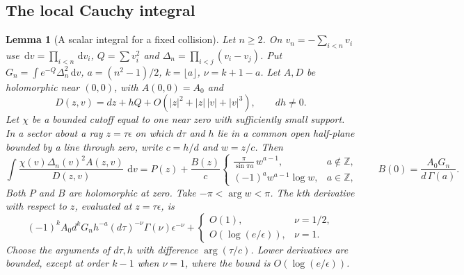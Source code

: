 \documentclass[11pt]{article}
\numberwithin{equation}{section}
\newtheorem{lemma}[theorem]{Lemma}
\theoremstyle{definition}
\newcommand{\dd}{\,\mathrm d}
\begin{document}
\subsection{The local Cauchy integral}

\begin{lemma}[A scalar integral for a fixed collision]\label{lem:local-period}
Let $n\ge2$. On $v_n=-\sum_{i<n}v_i$ use $\dd v=\prod_{i<n}\dd v_i$,
$Q=\sum v_i^2$ and $\Delta_n=\prod_{i<j}(v_i-v_j)$. Put
$G_n=\int e^{-Q}\Delta_n^2\dd v$, $a=(n^2-1)/2$,
$k=\lfloor a\rfloor$, $\nu=k+1-a$. Let $A,D$ be holomorphic near
$(0,0)$, with $A(0,0)=A_0$ and
\[
 D(z,v)=dz+hQ+O(|z|^2+|z|\,|v|+|v|^3),\qquad dh\ne0 .
\]
Let $\chi$ be a bounded cutoff equal to one near zero with sufficiently
small support. In a sector about a ray $z=\tau\epsilon$ on which
$d\tau$ and $h$ lie in a common open half-plane bounded by a line
through zero, write $c=h/d$ and $w=z/c$. Then
\[
 \int\frac{\chi(v)\Delta_n(v)^2 A(z,v)}{D(z,v)}\,\dd v
 =P(z)+\frac{B(z)}{c}
 \begin{cases}
   \displaystyle\frac{\pi}{\sin\pi a}\,w^{a-1},&a\notin\mathbb Z,\\
   (-1)^a w^{a-1}\log w,&a\in\mathbb Z ,
 \end{cases}
 \qquad B(0)=\frac{A_0G_n}{d\,\Gamma(a)} .
\]
Both $P$ and $B$ are holomorphic at zero. Take $-\pi<\arg w<\pi$.
The $k$th derivative with respect to $z$, evaluated at $z=\tau\epsilon$, is
\begin{equation}\label{eq:local-period}
 (-1)^k A_0d^k G_n h^{-a}(d\tau)^{-\nu}\Gamma(\nu)\epsilon^{-\nu}
  +\begin{cases}O(1),&\nu=1/2,\\ O(\log(e/\epsilon)),&\nu=1.\end{cases}
\end{equation}
Choose the arguments of $d\tau,h$ with difference $\arg(\tau/c)$.
Lower derivatives are bounded, except at order $k-1$ when $\nu=1$,
where the bound is $O(\log(e/\epsilon))$.
\end{lemma}
\end{document}
